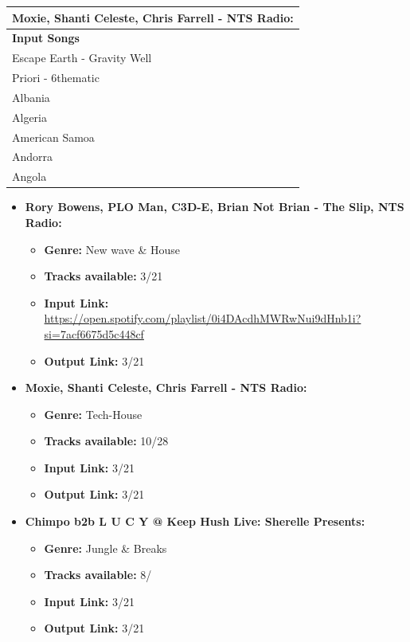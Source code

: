\begin{tabular}{ |p{3cm}|}
	\hline
	\multicolumn{1}{|c|}{Moxie, Shanti Celeste, Chris Farrell - NTS Radio:} \\
	\hline
	\textbf{Input Songs}\\
	\hline
	Escape Earth - Gravity Well \\
	Priori - 6thematic\\
	Albania \\
	Algeria \\
	American Samoa\\
	Andorra\\
	Angola\\
	\hline
\end{tabular}

\begin{itemize}
	\item \textbf{Rory Bowens, PLO Man, C3D-E, Brian Not Brian - The Slip, NTS Radio: } 
	\begin{itemize}
		\item \textbf{Genre:} New wave \& House
		\item \textbf{Tracks available:} 3/21
		\item \textbf{Input Link:} \hyperlink{sdsd}{https://open.spotify.com/playlist/0i4DAcdhMWRwNui9dHnb1i?si=7acf6675d5c448cf}
		\item \textbf{Output Link:} 3/21
	\end{itemize}
	\item \textbf{Moxie, Shanti Celeste, Chris Farrell - NTS Radio: } 
	\begin{itemize}
		\item \textbf{Genre:} Tech-House
		\item \textbf{Tracks available:} 10/28
		\item \textbf{Input Link:} 3/21
		\item \textbf{Output Link:} 3/21
	\end{itemize}
	\item \textbf{Chimpo b2b L U C Y @ Keep Hush Live: Sherelle Presents:}
	\begin{itemize}
		\item \textbf{Genre:} Jungle \& Breaks
		\item \textbf{Tracks available:} 8/
		\item \textbf{Input Link:} 3/21
		\item \textbf{Output Link:} 3/21
	\end{itemize}
	
\end{itemize}

